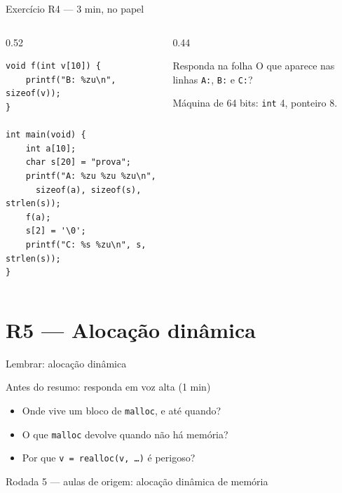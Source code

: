 \documentclass[aspectratio=169]{beamer}
\newcommand{\rodada}[4]{%
  \begin{frame}{Lembrar: #2}
    \begin{block}{Antes do resumo: responda em voz alta (1 min)}
      #4
    \end{block}
    \vfill
    {\small\textcolor{UFSGray}{Rodada #1 --- aulas de origem:} #3}
  \end{frame}}
\begin{document}
\begin{frame}[fragile]{Exercício R4 --- 3 min, no papel}
  \begin{columns}[T]
    \begin{column}{0.52\textwidth}
\begin{lstlisting}[style=numC]
void f(int v[10]) {
    printf("B: %zu\n", sizeof(v));
}

int main(void) {
    int a[10];
    char s[20] = "prova";
    printf("A: %zu %zu %zu\n",
      sizeof(a), sizeof(s), strlen(s));
    f(a);
    s[2] = '\0';
    printf("C: %s %zu\n", s, strlen(s));
}
\end{lstlisting}
    \end{column}
    \begin{column}{0.44\textwidth}
      \begin{block}{Responda na folha}
        O que aparece nas linhas \texttt{A:}, \texttt{B:} e \texttt{C:}?
      \end{block}
      \scriptsize\textcolor{UFSGray}{Máquina de 64 bits: \texttt{int} 4,
      ponteiro 8.}
    \end{column}
  \end{columns}
\end{frame}

\section{R5 --- Alocação dinâmica}

\rodada{5}{alocação dinâmica}{alocação dinâmica de memória}{
  \begin{itemize}
    \item Onde vive um bloco de \texttt{malloc}, e até quando?
    \item O que \texttt{malloc} devolve quando não há memória?
    \item Por que \texttt{v = realloc(v, \ldots)} é perigoso?
  \end{itemize}}
\end{document}
